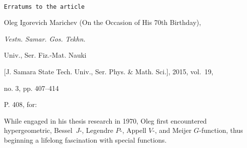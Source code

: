 
%

$\;$

\bigskip



\bigskip



\bigskip



\begin{center}

{\Large \texttt{Erratums to the article}}



\end{center}



\English



\noindent

Oleg Igorevich Marichev (On the Occasion of His 70th Birthday), {\it Vestn. Samar. Gos. Tekhn.

Univ., Ser. Fiz.-Mat. Nauki} [J. Samara State Tech. Univ., Ser. Phys. \& Math. Sci.], 2015, vol.~19,

no. 3, pp. 407–414 





%





\normalfont







\bigskip





\noindent

P. 408, for:



While engaged in his thesis research in 1970, Oleg first encountered hypergeometric, \mbox{Bessel~$J$-,} Legendre $P$-, Appell $V$-, and Meijer $G$-function, thus beginning a lifelong fascination with special functions.



